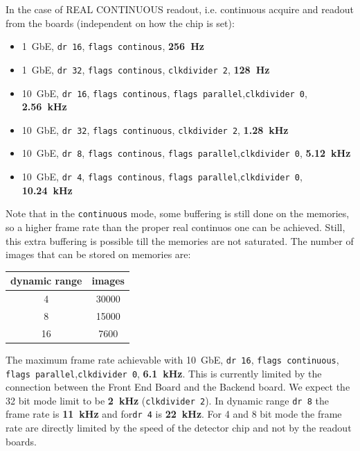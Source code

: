 \documentclass{article}
\begin{document}
In the case of REAL CONTINUOUS readout, i.e. continuous acquire and readout from the boards (independent on how the chip is set):
\begin{itemize}
\item 1~GbE, {\tt{dr 16}}, {\tt{flags continous}}, \textbf{256~Hz} 
\item 1~GbE, {\tt{dr 32}}, {\tt{flags continous}}, {\tt{clkdivider 2}}, \textbf{128~Hz}
\item 10~GbE, {\tt{dr 16}}, {\tt{flags continous}}, {\tt{flags parallel}},{\tt{clkdivider 0}}, \textbf{2.56~kHz}  
\item 10~GbE, {\tt{dr 32}}, {\tt{flags continuous}}, {\tt{clkdivider 2}}, \textbf{1.28~kHz}  
\item 10~GbE, {\tt{dr 8}}, {\tt{flags continous}}, {\tt{flags parallel}},{\tt{clkdivider 0}}, \textbf{5.12~kHz}
\item 10~GbE, {\tt{dr 4}}, {\tt{flags continous}}, {\tt{flags parallel}},{\tt{clkdivider 0}}, \textbf{10.24~kHz}
\end{itemize}
Note that in the {\tt{continuous}} mode, some buffering is still done on the memories, so a higher frame rate than the proper real continuos one can be achieved. Still, this extra buffering is possible till the memories are not saturated. 
The number of images that can be stored on memories are:
\ \\
\begin{tabular}{|c|c|}
\hline
dynamic range & images\\
\hline
4 & 30000\\
\hline
8 & 15000\\
\hline
16 & 7600\\
\hline
\end{tabular}

The maximum frame rate achievable with 10~GbE, {\tt{dr 16}}, {\tt{flags continuous}}, {\tt{flags parallel}},{\tt{clkdivider 0}}, \textbf{6.1~kHz}. This is currently limited by the connection between the Front End Board and the Backend board. We expect the 32 bit mode limit to be \textbf{2~kHz} ({\tt{clkdivider 2}}).
 In dynamic range {\tt{dr 8}} the frame rate is \textbf{11~kHz} and for{\tt{dr 4}} is \textbf{22~kHz}. For 4 and 8 bit mode the frame rate are directly limited by the speed of the detector chip and not by the readout boards.    
\end{document}
